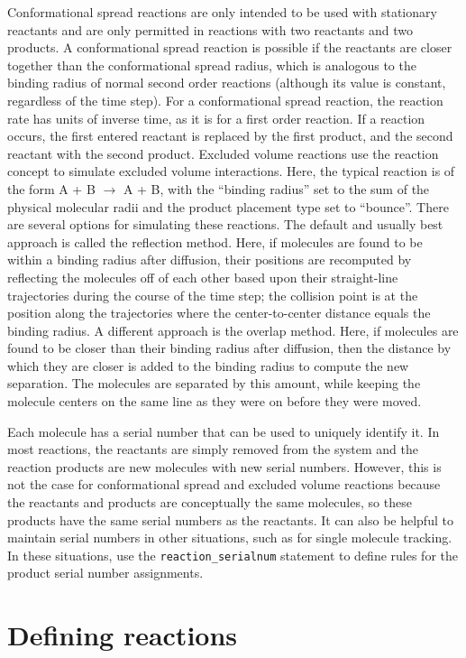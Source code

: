 \documentclass {book}
\newcommand {\ttt} {\texttt}
\begin{document}
Conformational spread reactions are only intended to be used with stationary reactants and are only permitted in reactions with two reactants and two products. A conformational spread reaction is possible if the reactants are closer together than the conformational spread radius, which is analogous to the binding radius of normal second order reactions (although its value is constant, regardless of the time step). For a conformational spread reaction, the reaction rate has units of inverse time, as it is for a first order reaction. If a reaction occurs, the first entered reactant is replaced by the first product, and the second reactant with the second product.
Excluded volume reactions use the reaction concept to simulate excluded volume interactions. Here, the typical reaction is of the form A + B $\rightarrow$ A + B, with the ``binding radius'' set to the sum of the physical molecular radii and the product placement type set to ``bounce''. There are several options for simulating these reactions. The default and usually best approach is called the reflection method. Here, if molecules are found to be within a binding radius after diffusion, their positions are recomputed by reflecting the molecules off of each other based upon their straight-line trajectories during the course of the time step; the collision point is at the position along the trajectories where the center-to-center distance equals the binding radius. A different approach is the overlap method. Here, if molecules are found to be closer than their binding radius after diffusion, then the distance by which they are closer is added to the binding radius to compute the new separation. The molecules are separated by this amount, while keeping the molecule centers on the same line as they were on before they were moved.

Each molecule has a serial number that can be used to uniquely identify it. In most reactions, the reactants are simply removed from the system and the reaction products are new molecules with new serial numbers. However, this is not the case for conformational spread and excluded volume reactions because the reactants and products are conceptually the same molecules, so these products have the same serial numbers as the reactants. It can also be helpful to maintain serial numbers in other situations, such as for single molecule tracking. In these situations, use the \ttt{reaction\_serialnum} statement to define rules for the product serial number assignments.

\section{Defining reactions}
\end{document}

